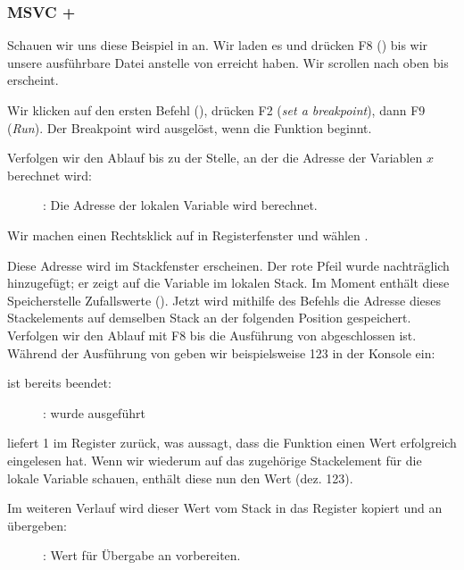 \clearpage
\subsubsection{MSVC + \olly}
\myindex{\olly}
Schauen wir uns diese Beispiel in \olly an.
Wir laden es und drücken F8 (\stepover) bis wir unsere ausführbare Datei anstelle von  erreicht haben. Wir scrollen nach oben bis \main erscheint.

Wir klicken auf den ersten Befehl (), drücken F2 (\emph{set a breakpoint}), dann F9 (\emph{Run}). Der Breakpoint wird ausgelöst, wenn die Funktion \main beginnt.

Verfolgen wir den Ablauf bis zu der Stelle, an der die Adresse der Variablen $x$ berechnet wird:

\begin{figure}[H]
\centering
{}
\caption{\olly: Die Adresse der lokalen Variable wird berechnet.}
\label{fig:scanf_ex1_olly_1}
\end{figure}

Wir machen einen Rechtsklick auf \EAX in Registerfenster und wählen . 

Diese Adresse wird im Stackfenster erscheinen. Der rote Pfeil wurde nachträglich hinzugefügt; er zeigt auf die Variable im lokalen Stack. Im Moment enthält diese Speicherstelle Zufallswerte (). Jetzt wird mithilfe des \PUSH Befehls die Adresse dieses Stackelements auf demselben Stack an der folgenden Position gespeichert. 
Verfolgen wir den Ablauf mit F8 bis die Ausführung von \scanf abgeschlossen ist. Während der Ausführung von \scanf geben wir beispielsweise 123 in der Konsole ein:



\clearpage
\scanf ist bereits beendet:

\begin{figure}[H]
\centering
{}
\caption{\olly: \scanf wurde ausgeführt}
\label{fig:scanf_ex1_olly_3}
\end{figure}

\scanf liefert 1 im \EAX Register zurück, was aussagt, dass die Funktion einen Wert erfolgreich eingelesen hat. Wenn wir wiederum auf das zugehörige Stackelement für die lokale Variable schauen, enthält diese nun den Wert  (dez. 123).

\clearpage
Im weiteren Verlauf wird dieser Wert vom Stack in das \ECX Register kopiert und an \printf übergeben:

\begin{figure}[H]
\centering
{}
\caption{\olly: Wert für Übergabe an \printf vorbereiten.}
\label{fig:scanf_ex1_olly_4}
\end{figure}

